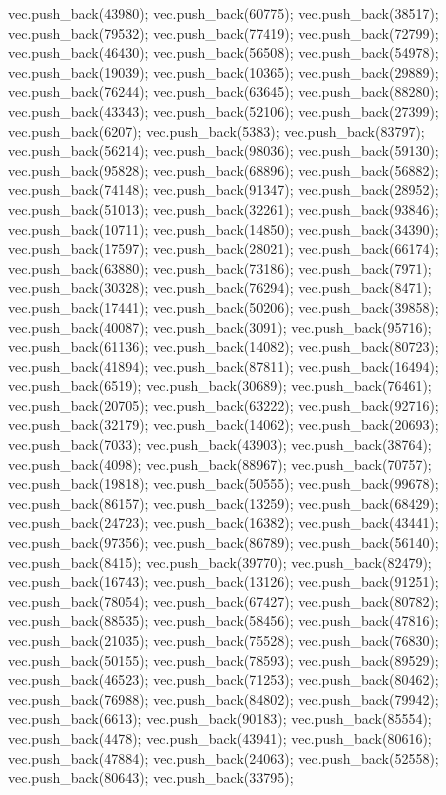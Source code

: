 vec.push_back(43980);
vec.push_back(60775);
vec.push_back(38517);
vec.push_back(79532);
vec.push_back(77419);
vec.push_back(72799);
vec.push_back(46430);
vec.push_back(56508);
vec.push_back(54978);
vec.push_back(19039);
vec.push_back(10365);
vec.push_back(29889);
vec.push_back(76244);
vec.push_back(63645);
vec.push_back(88280);
vec.push_back(43343);
vec.push_back(52106);
vec.push_back(27399);
vec.push_back(6207);
vec.push_back(5383);
vec.push_back(83797);
vec.push_back(56214);
vec.push_back(98036);
vec.push_back(59130);
vec.push_back(95828);
vec.push_back(68896);
vec.push_back(56882);
vec.push_back(74148);
vec.push_back(91347);
vec.push_back(28952);
vec.push_back(51013);
vec.push_back(32261);
vec.push_back(93846);
vec.push_back(10711);
vec.push_back(14850);
vec.push_back(34390);
vec.push_back(17597);
vec.push_back(28021);
vec.push_back(66174);
vec.push_back(63880);
vec.push_back(73186);
vec.push_back(7971);
vec.push_back(30328);
vec.push_back(76294);
vec.push_back(8471);
vec.push_back(17441);
vec.push_back(50206);
vec.push_back(39858);
vec.push_back(40087);
vec.push_back(3091);
vec.push_back(95716);
vec.push_back(61136);
vec.push_back(14082);
vec.push_back(80723);
vec.push_back(41894);
vec.push_back(87811);
vec.push_back(16494);
vec.push_back(6519);
vec.push_back(30689);
vec.push_back(76461);
vec.push_back(20705);
vec.push_back(63222);
vec.push_back(92716);
vec.push_back(32179);
vec.push_back(14062);
vec.push_back(20693);
vec.push_back(7033);
vec.push_back(43903);
vec.push_back(38764);
vec.push_back(4098);
vec.push_back(88967);
vec.push_back(70757);
vec.push_back(19818);
vec.push_back(50555);
vec.push_back(99678);
vec.push_back(86157);
vec.push_back(13259);
vec.push_back(68429);
vec.push_back(24723);
vec.push_back(16382);
vec.push_back(43441);
vec.push_back(97356);
vec.push_back(86789);
vec.push_back(56140);
vec.push_back(8415);
vec.push_back(39770);
vec.push_back(82479);
vec.push_back(16743);
vec.push_back(13126);
vec.push_back(91251);
vec.push_back(78054);
vec.push_back(67427);
vec.push_back(80782);
vec.push_back(88535);
vec.push_back(58456);
vec.push_back(47816);
vec.push_back(21035);
vec.push_back(75528);
vec.push_back(76830);
vec.push_back(50155);
vec.push_back(78593);
vec.push_back(89529);
vec.push_back(46523);
vec.push_back(71253);
vec.push_back(80462);
vec.push_back(76988);
vec.push_back(84802);
vec.push_back(79942);
vec.push_back(6613);
vec.push_back(90183);
vec.push_back(85554);
vec.push_back(4478);
vec.push_back(43941);
vec.push_back(80616);
vec.push_back(47884);
vec.push_back(24063);
vec.push_back(52558);
vec.push_back(80643);
vec.push_back(33795);
